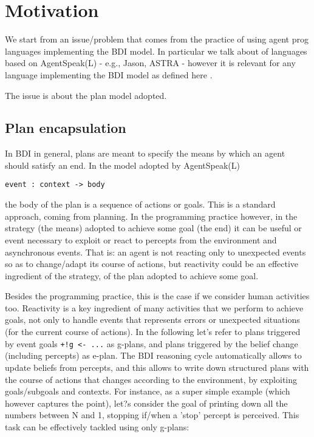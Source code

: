 \section{Motivation}

We start from an issue/problem that comes from the practice of using agent prog languages implementing the BDI model. 
%
In particular we talk about of languages based on AgentSpeak(L) - e.g., Jason, ASTRA - however it is relevant for any language implementing the BDI model as defined here \cite{}.

The issue is about the plan model adopted.

\subsection{Plan encapsulation}
%
In BDI in general, plans are meant to specify the means by which an agent should satisfy an end.  In the model adopted by AgentSpeak(L) 

\begin{small}
\begin{verbatim}
event : context -> body
\end{verbatim}
\end{small}

the body of the plan is a sequence of actions or goals. This is a standard approach, coming from planning.
%
In the programming practice however, in the strategy (the means) adopted to achieve some goal (the end) it can be useful or event necessary to exploit or react to percepts from the environment and  asynchronous events.   That is: an agent is not reacting only to unexpected events so as to change/adapt its course of actions, but reactivity could be an effective ingredient of the strategy, of the plan adopted to achieve some goal.

Besides the programming practice, this is the case if we consider human activities too. Reactivity is a key ingredient of many activities that we perform to achieve goals, not only to handle events that represents errors or unexpected situations (for the current course of actions).
%
In the following let's refer to plans triggered by event goals \texttt{+!g <- ...} as g-plans, and plans triggered by the belief change (including percepts) as e-plan.
%
The BDI reasoning cycle automatically allows to update beliefs from percepts, and this allows to write down structured plans with the course of actions that changes according to the environment, by exploiting goals/subgoals and contexts.
%
For instance, as a super simple example (which however captures the point), let?s consider the goal of  printing down all the numbers between N and 1, stopping if/when a 'stop' percept is perceived. 
%
This task can be effectively tackled using only g-plans:


